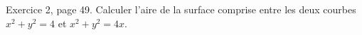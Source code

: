\begin{exercice}\label{exo0024}

Exercice 2, page 49. Calculer l'aire de la surface comprise entre les deux courbes $x^2+y^2=4$ et $x^2+y^2=4x$.

\end{exercice}
